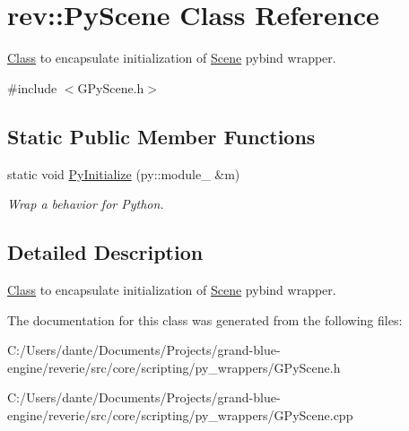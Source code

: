 \hypertarget{classrev_1_1_py_scene}{}\section{rev\+::Py\+Scene Class Reference}
\label{classrev_1_1_py_scene}


\mbox{\hyperlink{struct_class}{Class}} to encapsulate initialization of \mbox{\hyperlink{classrev_1_1_scene}{Scene}} pybind wrapper.  




{\ttfamily \#include $<$G\+Py\+Scene.\+h$>$}

\subsection*{Static Public Member Functions}
\begin{DoxyCompactItemize}
\item 
\mbox{\label{classrev_1_1_py_scene_a5c0430f5bd7cebb0ebd9838cfb4844b0}} 
static void \mbox{\hyperlink{classrev_1_1_py_scene_a5c0430f5bd7cebb0ebd9838cfb4844b0}{Py\+Initialize}} (py\+::module\+\_\+ \&m)
\begin{DoxyCompactList}\small\item\em Wrap a behavior for Python. \end{DoxyCompactList}\end{DoxyCompactItemize}


\subsection{Detailed Description}
\mbox{\hyperlink{struct_class}{Class}} to encapsulate initialization of \mbox{\hyperlink{classrev_1_1_scene}{Scene}} pybind wrapper. 

The documentation for this class was generated from the following files\+:\begin{DoxyCompactItemize}
\item 
C\+:/\+Users/dante/\+Documents/\+Projects/grand-\/blue-\/engine/reverie/src/core/scripting/py\+\_\+wrappers/G\+Py\+Scene.\+h\item 
C\+:/\+Users/dante/\+Documents/\+Projects/grand-\/blue-\/engine/reverie/src/core/scripting/py\+\_\+wrappers/G\+Py\+Scene.\+cpp\end{DoxyCompactItemize}
